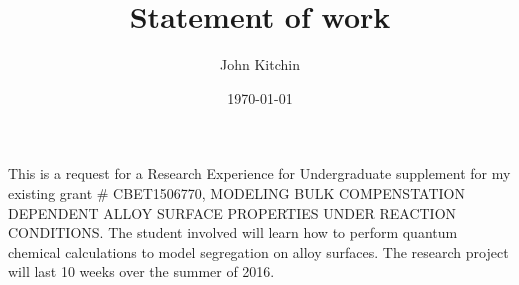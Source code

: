 \documentclass[12pt]{article}
\author{John Kitchin}
\date{\today}
\title{Statement of work}
\begin{document}
\date{}
\author{}
\maketitle

This is a request for a Research Experience for Undergraduate supplement for my existing grant \# CBET1506770,  MODELING BULK COMPENSTATION DEPENDENT ALLOY SURFACE PROPERTIES UNDER REACTION CONDITIONS. The student involved will learn how to perform quantum chemical calculations to model segregation on alloy surfaces. The research project will last 10 weeks over the summer of 2016.
\end{document}
